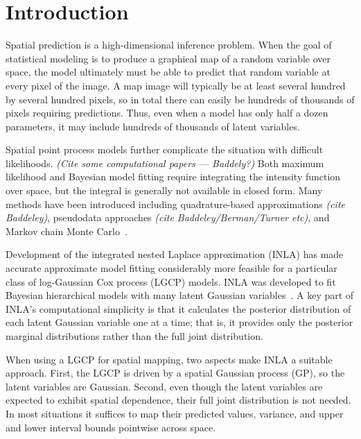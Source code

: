 \documentclass[]{interact}
\begin{document}
\section{Introduction}


Spatial prediction is a high-dimensional inference problem. When the goal of
statistical modeling is to produce a graphical map of a random variable over
space, the model ultimately must be able to predict that random variable at
every pixel of the image. A map image will typically be at least several
hundred by several hundred pixels, so in total there can easily be hundreds of
thousands of pixels requiring predictions. Thus, even when a model has only
half a dozen parameters, it may include hundreds of thousands of latent
variables.

Spatial point process models further complicate the situation with difficult
likelihoods. {\it (Cite some computational papers --- Baddely?)} Both maximum
likelihood and Bayesian model fitting require integrating the intensity
function over space, but the integral is generally not available in closed
form. Many methods have been introduced including quadrature-based
approximations {\it (cite Baddeley)}, pseudodata approaches
{\it (cite Baddeley/Berman/Turner etc)}, and Markov chain Monte
Carlo~\cite{moellerwaagepetersen}.

Development of the integrated nested Laplace approximation (INLA) has made
accurate approximate model fitting considerably more feasible for a particular
class of log-Gaussian Cox process (LGCP) models. INLA was developed to fit
Bayesian hierarchical models with many latent Gaussian
variables~\cite{rueetal}. A key part of INLA's computational simplicity is that
it calculates the posterior distribution of each latent Gaussian variable one
at a time; that is, it provides only the posterior marginal distributions
rather than the full joint distribution.

When using a LGCP for spatial mapping, two aspects make INLA a suitable
approach. First, the LGCP is driven by a spatial Gaussian process (GP), so the
latent variables are Gaussian. Second, even though the latent variables are
expected to exhibit spatial dependence, their full joint distribution is not
needed. In most situations it suffices to map their predicted values, variance,
and upper and lower interval bounds pointwise across space.
\end{document}
